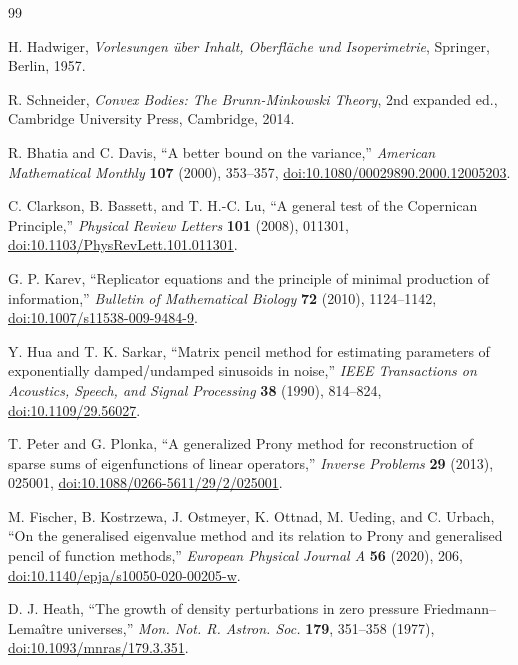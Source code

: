\documentclass[aps,prd,preprint,onecolumn,nofootinbib,superscriptaddress,showkeys]{revtex4-2}
\numberwithin{equation}{section}
\theoremstyle{definition}
\theoremstyle{plain}
\begin{document}
\begin{thebibliography}{99}

H. Hadwiger, \emph{Vorlesungen \"uber Inhalt, Oberfl\"ache und Isoperimetrie}, Springer, Berlin, 1957.

R. Schneider, \emph{Convex Bodies: The Brunn-Minkowski Theory}, 2nd expanded ed., Cambridge University Press, Cambridge, 2014.

R. Bhatia and C. Davis, ``A better bound on the variance,''
\emph{American Mathematical Monthly} \textbf{107} (2000), 353--357,
\href{https://doi.org/10.1080/00029890.2000.12005203}{doi:10.1080/00029890.2000.12005203}.

C. Clarkson, B. Bassett, and T. H.-C. Lu, ``A general test of the Copernican Principle,''
\emph{Physical Review Letters} \textbf{101} (2008), 011301,
\href{https://doi.org/10.1103/PhysRevLett.101.011301}{doi:10.1103/PhysRevLett.101.011301}.

G. P. Karev, ``Replicator equations and the principle of minimal production of information,''
\emph{Bulletin of Mathematical Biology} \textbf{72} (2010), 1124--1142,
\href{https://doi.org/10.1007/s11538-009-9484-9}{doi:10.1007/s11538-009-9484-9}.

Y. Hua and T. K. Sarkar, ``Matrix pencil method for estimating parameters of exponentially damped/undamped sinusoids in noise,''
\emph{IEEE Transactions on Acoustics, Speech, and Signal Processing} \textbf{38} (1990), 814--824,
\href{https://doi.org/10.1109/29.56027}{doi:10.1109/29.56027}.

T. Peter and G. Plonka, ``A generalized Prony method for reconstruction of sparse sums of eigenfunctions of linear operators,''
\emph{Inverse Problems} \textbf{29} (2013), 025001,
\href{https://doi.org/10.1088/0266-5611/29/2/025001}{doi:10.1088/0266-5611/29/2/025001}.

M. Fischer, B. Kostrzewa, J. Ostmeyer, K. Ottnad, M. Ueding, and C. Urbach,
``On the generalised eigenvalue method and its relation to Prony and generalised pencil of function methods,''
\emph{European Physical Journal A} \textbf{56} (2020), 206,
\href{https://doi.org/10.1140/epja/s10050-020-00205-w}{doi:10.1140/epja/s10050-020-00205-w}.

D. J. Heath, ``The growth of density perturbations in zero pressure Friedmann--Lema\^itre universes,''
\emph{Mon. Not. R. Astron. Soc.} \textbf{179}, 351--358 (1977),
\href{https://doi.org/10.1093/mnras/179.3.351}{doi:10.1093/mnras/179.3.351}.


\end{thebibliography}
\end{document}
